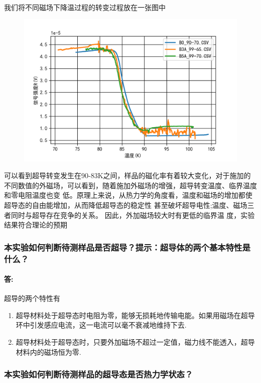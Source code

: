 \documentclass{ctexart}
\theoremstyle{ansstyle}
\begin{document}
\paragraph{}我们将不同磁场下降温过程的转变过程放在一张图中
\begin{figure}[H]
    \centering
    \includegraphics[width=1.\linewidth]{./png/10.png}

\end{figure}
可以看到超导转变发生在90-83K之间，样品的磁化率有着较大变化，对于施加的不同数值的外磁场，可以看到，随着施加外磁场的增强，超导转变温度、临界温度和零电阻温度也变
低。原理上来说，从热力学的角度看，温度和磁场的增加都使超导态的自由能增加，从而降低超导态的稳定性
甚至破坏超导电性;温度、磁场三者同时与超导存在竞争的关系。 因此，外加磁场较大时有更低的临界温
度，实验结果符合理论的预期
\subsubsection{本实验如何判断待测样品是否超导？提示：超导体的两个基本特性是
    什么？}
\paragraph{答:} 超导的两个特性有
\begin{enumerate}
    \item 超导材料处于超导态时电阻为零，能够无损耗地传输电能。如果用磁场在超导环中引发感应电流，这一电流可以毫不衰减地维持下去.
    \item 超导材料处于超导态时，只要外加磁场不超过一定值，磁力线不能透入，超导材料内的磁场恒为零.
\end{enumerate}

\subsubsection{本实验如何判断待测样品的超导态是否热力学状态？ }
\end{document}
